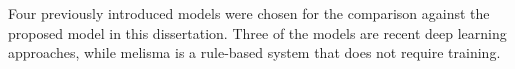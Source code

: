 
Four previously introduced models were chosen for the
comparison against the proposed model in this dissertation.
Three of the models are recent deep learning approaches,
while \gls{melisma} is a rule-based system that does not
require training.
